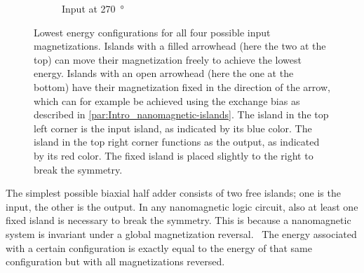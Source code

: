 \documentclass[11pt,a4paper,english]{article}
\begin{document}
\begin{figure}
\begin{subfigure}[t]{0.23\textwidth}
    \caption{Input at \SI{270}{\degree}}
\end{subfigure}
\caption{Lowest energy configurations for all four possible input magnetizations. Islands with a filled arrowhead (here the two at the top) can move their magnetization freely to achieve the lowest energy. Islands with an open arrowhead (here the one at the bottom) have their magnetization fixed in the direction of the arrow, which can for example be achieved using the exchange bias as described in \cref{par:Intro_nanomagnetic-islands}. The island in the top left corner is the input island, as indicated by its blue color. The island in the top right corner functions as the output, as indicated by its red color. The fixed island is placed slightly to the right to break the symmetry.} %
\label{fig:HalfAdder_000006_configurations}
\end{figure}

The simplest possible biaxial half adder consists of two free islands; one is the input, the other is the output. In any nanomagnetic logic circuit, also at least one fixed island is necessary to break the symmetry. This is because a nanomagnetic system is invariant under a global magnetization reversal.~\cite{GYP-18} The energy associated with a certain configuration is exactly equal to the energy of that same configuration but with all magnetizations reversed.
\end{document}
